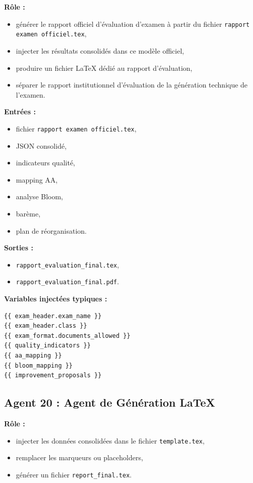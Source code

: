 \documentclass[12pt,a4paper]{article}
\begin{document}
\textbf{Rôle :}
\begin{itemize}[leftmargin=1cm]
    \item générer le rapport officiel d’évaluation d’examen à partir du fichier \texttt{rapport examen officiel.tex},
    \item injecter les résultats consolidés dans ce modèle officiel,
    \item produire un fichier LaTeX dédié au rapport d’évaluation,
    \item séparer le rapport institutionnel d’évaluation de la génération technique de l’examen.
\end{itemize}

\textbf{Entrées :}
\begin{itemize}[leftmargin=1cm]
    \item fichier \texttt{rapport examen officiel.tex},
    \item JSON consolidé,
    \item indicateurs qualité,
    \item mapping AA,
    \item analyse Bloom,
    \item barème,
    \item plan de réorganisation.
\end{itemize}

\textbf{Sorties :}
\begin{itemize}[leftmargin=1cm]
    \item \texttt{rapport\_evaluation\_final.tex},
    \item \texttt{rapport\_evaluation\_final.pdf}.
\end{itemize}

\textbf{Variables injectées typiques :}
\begin{lstlisting}
{{ exam_header.exam_name }}
{{ exam_header.class }}
{{ exam_format.documents_allowed }}
{{ quality_indicators }}
{{ aa_mapping }}
{{ bloom_mapping }}
{{ improvement_proposals }}
\end{lstlisting}

\subsection*{Agent 20 : Agent de Génération LaTeX}

\textbf{Rôle :}
\begin{itemize}[leftmargin=1cm]
    \item injecter les données consolidées dans le fichier \texttt{template.tex},
    \item remplacer les marqueurs ou placeholders,
    \item générer un fichier \texttt{report\_final.tex}.
\end{itemize}
\end{document}
